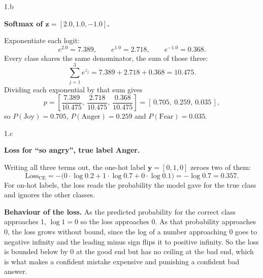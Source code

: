 \LARGE
1.b
\normalsize

\begin{answer}
  \textbf{Softmax of $\mathbf{z} = [2.0, 1.0, -1.0]$.}

  \medskip
  Exponentiate each logit:
  \[
    e^{2.0} = 7.389, \qquad e^{1.0} = 2.718, \qquad e^{-1.0} = 0.368 .
  \]
  Every class shares the same denominator, the sum of those three:
  \[
    \sum_{j=1}^{3} e^{z_j} = 7.389 + 2.718 + 0.368 = 10.475 .
  \]
  Dividing each exponential by that sum gives
  \[
    p = \left[\frac{7.389}{10.475},\ \frac{2.718}{10.475},\ \frac{0.368}{10.475}\right]
      = [\,0.705,\ 0.259,\ 0.035\,],
  \]
  so $P(\text{Joy}) = 0.705$, $P(\text{Anger}) = 0.259$ and $P(\text{Fear}) = 0.035$.
\end{answer}

\LARGE
1.c
\normalsize

\begin{answer}
  \textbf{Loss for ``so angry'', true label Anger.}

  \medskip
  Writing all three terms out, the one-hot label $\mathbf{y} = [0, 1, 0]$ zeroes two of them:
  \[
    \text{Loss}_{\text{CE}}
      = -\big(0 \cdot \log 0.2 + 1 \cdot \log 0.7 + 0 \cdot \log 0.1\big)
      = -\log 0.7
      = 0.357 .
  \]
  For on-hot labels, the loss reads the probability the model gave for the true class and ignores the other classes.

  \medskip
  \textbf{Behaviour of the loss.} As the predicted probability for the correct class approaches 1, $\log 1 = 0$ so
  the loss approaches 0. As that probability approaches 0, the loss grows
  without bound, since the log of a number approaching 0 goes to negative infinity and the leading
  minus sign flips it to positive infinity. So the loss is bounded below by 0 at the good end but
  has no ceiling at the bad end, which is what makes a confident mistake expensive and punishing a confident bad answer.
\end{answer}


